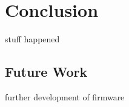 \chapter{Conclusion}\label{ch:conclusion}

stuff happened

\section{Future Work}

further development of firmware
